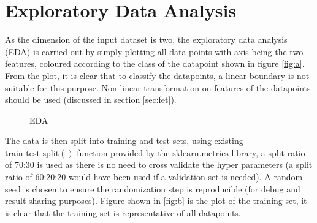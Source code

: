 \documentclass[journal]{IEEEtran}
\begin{document}
\section{Exploratory Data Analysis}
As the dimension of the input dataset is two, the exploratory data analysis (EDA) is carried out by simply plotting all data points with axis being the two features, coloured according to the class of the datapoint shown in figure \ref{fig:a}. From the plot, it is clear that to classify the datapoints, a linear boundary is not suitable for this purpose. Non linear transformation on features of the datapoints should be used (discussed in section \ref{sec:fet}).\\
\begin{figure}[htbp]
\centering     %
{}
\caption{EDA}
\end{figure}
The data is then split into training and test sets, using existing $\text{train\_test\_split}()$ function provided by the $\text{sklearn.metrics}$ library, a split ratio of 70:30 is used as there is no need to cross validate the hyper parameters (a split ratio of 60:20:20 would have been used if a validation set is needed). A random seed is chosen to ensure the randomization step is reproducible (for debug and result sharing purposes). Figure shown in \ref{fig:b} is the plot of the training set, it is clear that the training set is representative of all datapoints.
\end{document}
